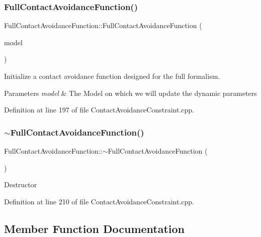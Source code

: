 \subsubsection{\texorpdfstring{Full\+Contact\+Avoidance\+Function()}{FullContactAvoidanceFunction()}}
{\footnotesize\ttfamily Full\+Contact\+Avoidance\+Function\+::\+Full\+Contact\+Avoidance\+Function (\begin{DoxyParamCaption}\item[{const Model \&}]{model }\end{DoxyParamCaption})}

Initialize a contact avoidance function designed for the full formalism.


\begin{DoxyParams}{Parameters}
{\em model} & The Model on which we will update the dynamic parameters \\
\hline
\end{DoxyParams}


Definition at line 197 of file Contact\+Avoidance\+Constraint.\+cpp.

\hypertarget{classocra_1_1FullContactAvoidanceFunction_abf414a050f3b16c4a095049937335c96}{}\label{classocra_1_1FullContactAvoidanceFunction_abf414a050f3b16c4a095049937335c96} 
\subsubsection{\texorpdfstring{$\sim$\+Full\+Contact\+Avoidance\+Function()}{~FullContactAvoidanceFunction()}}
{\footnotesize\ttfamily Full\+Contact\+Avoidance\+Function\+::$\sim$\+Full\+Contact\+Avoidance\+Function (\begin{DoxyParamCaption}{ }\end{DoxyParamCaption})}

Destructor 

Definition at line 210 of file Contact\+Avoidance\+Constraint.\+cpp.



\subsection{Member Function Documentation}
\hypertarget{classocra_1_1FullContactAvoidanceFunction_ae24690ecd464eefd43936907e33c4cb9}{}\label{classocra_1_1FullContactAvoidanceFunction_ae24690ecd464eefd43936907e33c4cb9} 
